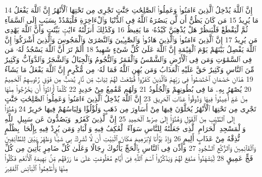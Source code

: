 {\tiny\colorbox{cl_aya}{14}} إِنَّ ٱللَّهَ يُدْخِلُ ٱلَّذِينَ ءَامَنُوا۟ وَعَمِلُوا۟ ٱلصَّٰلِحَٰتِ جَنَّٰتٍ تَجْرِى مِن تَحْتِهَا ٱلْأَنْهَٰرُ إِنَّ ٱللَّهَ يَفْعَلُ مَا يُرِيدُ
{\tiny\colorbox{cl_aya}{15}} مَن كَانَ يَظُنُّ أَن لَّن يَنصُرَهُ ٱللَّهُ فِى ٱلدُّنْيَا وَٱلْءَاخِرَةِ فَلْيَمْدُدْ بِسَبَبٍ إِلَى ٱلسَّمَآءِ ثُمَّ لْيَقْطَعْ فَلْيَنظُرْ هَلْ يُذْهِبَنَّ كَيْدُهُۥ مَا يَغِيظُ
{\tiny\colorbox{cl_aya}{16}} وَكَذَٰلِكَ أَنزَلْنَٰهُ ءَايَٰتٍۭ بَيِّنَٰتٍ وَأَنَّ ٱللَّهَ يَهْدِى مَن يُرِيدُ
{\tiny\colorbox{cl_aya}{17}} إِنَّ ٱلَّذِينَ ءَامَنُوا۟ وَٱلَّذِينَ هَادُوا۟ وَٱلصَّٰبِـِٔينَ وَٱلنَّصَٰرَىٰ وَٱلْمَجُوسَ وَٱلَّذِينَ أَشْرَكُوٓا۟ إِنَّ ٱللَّهَ يَفْصِلُ بَيْنَهُمْ يَوْمَ ٱلْقِيَٰمَةِ إِنَّ ٱللَّهَ عَلَىٰ كُلِّ شَىْءٍ شَهِيدٌ
{\tiny\colorbox{cl_aya}{18}} أَلَمْ تَرَ أَنَّ ٱللَّهَ يَسْجُدُ لَهُۥ مَن فِى ٱلسَّمَٰوَٰتِ وَمَن فِى ٱلْأَرْضِ وَٱلشَّمْسُ وَٱلْقَمَرُ وَٱلنُّجُومُ وَٱلْجِبَالُ وَٱلشَّجَرُ وَٱلدَّوَآبُّ وَكَثِيرٌ مِّنَ ٱلنَّاسِ وَكَثِيرٌ حَقَّ عَلَيْهِ ٱلْعَذَابُ وَمَن يُهِنِ ٱللَّهُ فَمَا لَهُۥ مِن مُّكْرِمٍ إِنَّ ٱللَّهَ يَفْعَلُ مَا يَشَآءُ
{\tiny\colorbox{cl_aya}{19}} هَٰذَانِ خَصْمَانِ ٱخْتَصَمُوا۟ فِى رَبِّهِمْ فَٱلَّذِينَ كَفَرُوا۟ قُطِّعَتْ لَهُمْ ثِيَابٌ مِّن نَّارٍ يُصَبُّ مِن فَوْقِ رُءُوسِهِمُ ٱلْحَمِيمُ
{\tiny\colorbox{cl_aya}{20}} يُصْهَرُ بِهِۦ مَا فِى بُطُونِهِمْ وَٱلْجُلُودُ
{\tiny\colorbox{cl_aya}{21}} وَلَهُم مَّقَٰمِعُ مِنْ حَدِيدٍ
{\tiny\colorbox{cl_aya}{22}} كُلَّمَآ أَرَادُوٓا۟ أَن يَخْرُجُوا۟ مِنْهَا مِنْ غَمٍّ أُعِيدُوا۟ فِيهَا وَذُوقُوا۟ عَذَابَ ٱلْحَرِيقِ
{\tiny\colorbox{cl_aya}{23}} إِنَّ ٱللَّهَ يُدْخِلُ ٱلَّذِينَ ءَامَنُوا۟ وَعَمِلُوا۟ ٱلصَّٰلِحَٰتِ جَنَّٰتٍ تَجْرِى مِن تَحْتِهَا ٱلْأَنْهَٰرُ يُحَلَّوْنَ فِيهَا مِنْ أَسَاوِرَ مِن ذَهَبٍ وَلُؤْلُؤًا وَلِبَاسُهُمْ فِيهَا حَرِيرٌ
{\tiny\colorbox{cl_aya}{24}} وَهُدُوٓا۟ إِلَى ٱلطَّيِّبِ مِنَ ٱلْقَوْلِ وَهُدُوٓا۟ إِلَىٰ صِرَٰطِ ٱلْحَمِيدِ
{\tiny\colorbox{cl_aya}{25}} إِنَّ ٱلَّذِينَ كَفَرُوا۟ وَيَصُدُّونَ عَن سَبِيلِ ٱللَّهِ وَٱلْمَسْجِدِ ٱلْحَرَامِ ٱلَّذِى جَعَلْنَٰهُ لِلنَّاسِ سَوَآءً ٱلْعَٰكِفُ فِيهِ وَٱلْبَادِ وَمَن يُرِدْ فِيهِ بِإِلْحَادٍۭ بِظُلْمٍ نُّذِقْهُ مِنْ عَذَابٍ أَلِيمٍ
{\tiny\colorbox{cl_aya}{26}} وَإِذْ بَوَّأْنَا لِإِبْرَٰهِيمَ مَكَانَ ٱلْبَيْتِ أَن لَّا تُشْرِكْ بِى شَيْـًٔا وَطَهِّرْ بَيْتِىَ لِلطَّآئِفِينَ وَٱلْقَآئِمِينَ وَٱلرُّكَّعِ ٱلسُّجُودِ
{\tiny\colorbox{cl_aya}{27}} وَأَذِّن فِى ٱلنَّاسِ بِٱلْحَجِّ يَأْتُوكَ رِجَالًا وَعَلَىٰ كُلِّ ضَامِرٍ يَأْتِينَ مِن كُلِّ فَجٍّ عَمِيقٍ
{\tiny\colorbox{cl_aya}{28}} لِّيَشْهَدُوا۟ مَنَٰفِعَ لَهُمْ وَيَذْكُرُوا۟ ٱسْمَ ٱللَّهِ فِىٓ أَيَّامٍ مَّعْلُومَٰتٍ عَلَىٰ مَا رَزَقَهُم مِّنۢ بَهِيمَةِ ٱلْأَنْعَٰمِ فَكُلُوا۟ مِنْهَا وَأَطْعِمُوا۟ ٱلْبَآئِسَ ٱلْفَقِيرَ
